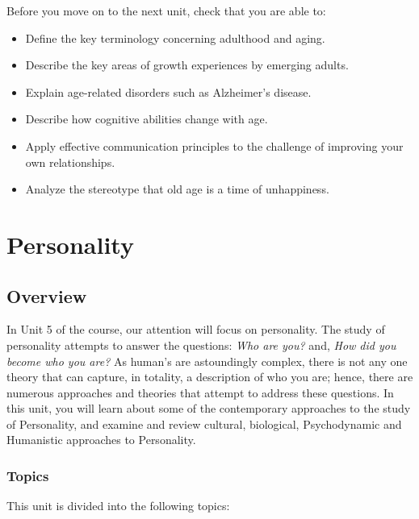 \documentclass[
]{book}
\begin{document}
\begin{progress}
Before you move on to the next unit, check that you are able to:

\begin{itemize}
\item
  Define the key terminology concerning adulthood and aging.
\item
  Describe the key areas of growth experiences by emerging adults.
\item
  Explain age-related disorders such as Alzheimer's disease.
\item
  Describe how cognitive abilities change with age.
\item
  Apply effective communication principles to the challenge of improving your own relationships.
\item
  Analyze the stereotype that old age is a time of unhappiness.
\end{itemize}
\end{progress}

\hypertarget{personality}{%
\chapter{Personality}\label{personality}}

\hypertarget{overview-4}{%
\section*{Overview}\label{overview-4}}

In Unit 5 of the course, our attention will focus on personality. The study of personality attempts to answer the questions: \emph{Who are you?} and, \emph{How did you become who you are?} As human's are astoundingly complex, there is not any one theory that can capture, in totality, a description of who you are; hence, there are numerous approaches and theories that attempt to address these questions. In this unit, you will learn about some of the contemporary approaches to the study of Personality, and examine and review cultural, biological, Psychodynamic and Humanistic approaches to Personality.

\hypertarget{topics-4}{%
\subsection*{Topics}\label{topics-4}}

This unit is divided into the following topics:
\end{document}
